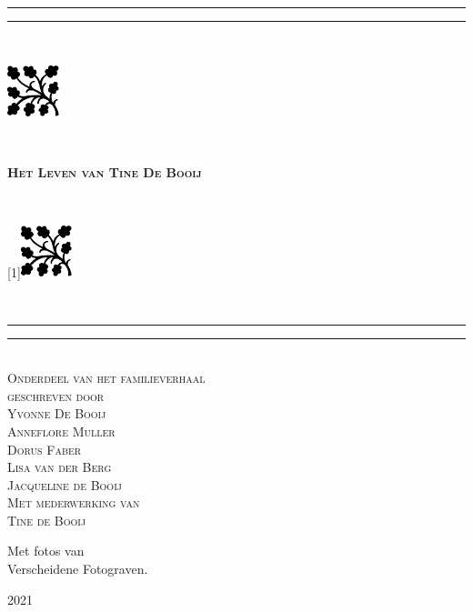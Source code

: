 {\begingroup
\centering 
\vfill
\parbox{\textwidth}{%
\rule{\textwidth}{1.6pt}\vspace*{-\baselineskip}\vspace*{2pt} %
\rule{\textwidth}{0.4pt}\\[0.2\baselineskip] %
\parbox{\textwidth}{%
\parbox[c][1.5cm][c]{1.5cm}{\includegraphics[height=1.5cm]{tikz/19}}
~ \hrulefill ~
\parbox[c][2cm][c]{7cm}{\centering\textsc{\Large \textbf{Het Leven van Tine De Booij}}}
 ~\hrulefill ~
\parbox[c][1.5cm][c]{1.5cm}{\scalebox{-1}[1]{\includegraphics[height=1.5cm]{tikz/19}}}}\\[0.2\baselineskip] %
\rule{\textwidth}{0.4pt}\vspace*{-\baselineskip}\vspace{3.2pt} %
\rule{\textwidth}{1.6pt}}\\[\baselineskip] %
\scshape %
Onderdeel van het familieverhaal \\[0.2\baselineskip] %

\vspace*{2\baselineskip} %
geschreven door \\[0.5\baselineskip]
{\Large Yvonne De Booij } \\
{\Large Anneflore Muller} \\
{\Large Dorus Faber} \\
{\Large Lisa van der Berg} \\
{\Large Jacqueline de Booij} \\


\vfill
{Met mederwerking van  \\ {Tine de Booij}} %
\vfill \vfill
{Met fotos van  \\ {Verscheidene Fotograven.}\par} %

\vfill %

{\scshape 2021} \\[0.3\baselineskip] %

\endgroup}
